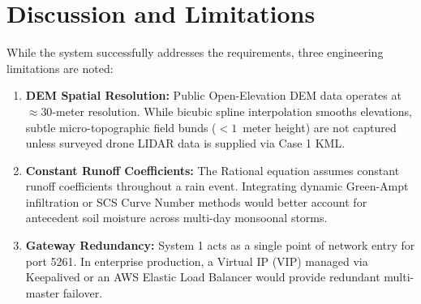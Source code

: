 \documentclass[manuscript,screen,review]{acmart}
\begin{document}
\section{Discussion and Limitations}
\label{sec:discussion}
While the system successfully addresses the requirements, three engineering limitations are noted:
\begin{enumerate}
    \item \textbf{DEM Spatial Resolution:} Public Open-Elevation DEM data operates at $\approx 30$-meter resolution. While bicubic spline interpolation smooths elevations, subtle micro-topographic field bunds ($<1$~meter height) are not captured unless surveyed drone LIDAR data is supplied via Case 1 KML.
    \item \textbf{Constant Runoff Coefficients:} The Rational equation assumes constant runoff coefficients throughout a rain event. Integrating dynamic Green-Ampt infiltration or SCS Curve Number methods would better account for antecedent soil moisture across multi-day monsoonal storms.
    \item \textbf{Gateway Redundancy:} System 1 acts as a single point of network entry for port 5261. In enterprise production, a Virtual IP (VIP) managed via Keepalived or an AWS Elastic Load Balancer would provide redundant multi-master failover.
\end{enumerate}

\end{document}
